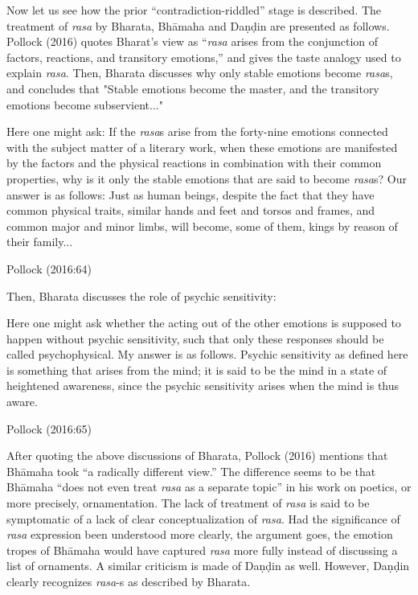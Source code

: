 Now let us see how the prior “contradiction-riddled” stage is described. The treatment of \textsl{rasa }by Bharata, Bhāmaha and Daṇḍin are presented as follows. Pollock (2016) quotes Bharat’s view as “\textsl{rasa} arises from the conjunction of factors, reactions, and transitory emotions,” and gives the taste analogy used to explain \textsl{rasa}. Then, Bharata discusses why only stable emotions become \textsl{rasa}s, and concludes that "Stable emotions become the master, and the transitory emotions become subservient..." 

\begin{myquote}
[343] Here one might ask: If the \textsl{rasa}s arise from the forty-nine emotions connected with the subject matter of a literary work, when these emotions are manifested by the factors and the physical reactions in combination with their common properties, why is it only the stable emotions that are said to become \textsl{rasa}s? Our answer is as follows: Just as human beings, despite the fact that they have common physical traits, similar hands and feet and torsos and frames, and common major and minor limbs, will become, some of them, kings by reason of their family...

\hfill Pollock (2016:64)
\end{myquote}

Then, Bharata discusses the role of psychic sensitivity:

\begin{myquote}
[373.3] Here one might ask whether the acting out of the other emotions is supposed to happen without psychic sensitivity, such that only these responses should be called psychophysical. My answer is as follows. Psychic sensitivity as defined here is something that arises from the mind; it is said to be the mind in a state of heightened awareness, since the psychic sensitivity arises when the mind is thus aware.

\hfill Pollock (2016:65)
\end{myquote}

After quoting the above discussions of Bharata, Pollock (2016) mentions that Bhāmaha took “a radically different view.” The difference seems to be that Bhāmaha “does not even treat \textsl{rasa} as a separate topic” in his work on poetics, or more precisely, ornamentation. The lack of treatment of \textsl{rasa }is said to be symptomatic of a lack of clear conceptualization of \textsl{rasa}. Had the significance of \textsl{rasa }expression been understood more clearly, the argument goes, the emotion tropes of Bhāmaha would have captured \textsl{rasa }more fully instead of discussing a list of ornaments. A similar criticism is made of Daṇḍin as well. However, Daṇḍin clearly recognizes \textsl{rasa}-s as described by Bharata. 

